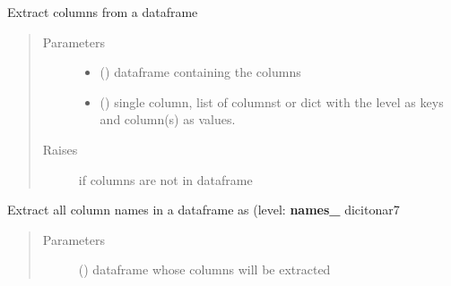 \documentclass[letterpaper,10pt,english]{sphinxmanual}
\begin{document}
\begin{fulllineitems}
\label{\detokenize{dalio.util:dalio.util.level_utils.extract_cols}}
Extract columns from a dataframe
\begin{quote}\begin{description}
\item[{Parameters}] \leavevmode\begin{itemize}
\item {} 
 () \textendash{} dataframe containing the columns

\item {} 
 (\sphinxstyleliteralemphasis{\sphinxupquote{, }}\sphinxstyleliteralemphasis{\sphinxupquote{, }}) \textendash{} single column, list of columnst
or dict with the level as keys and column(s) as values.

\end{itemize}

\item[{Raises}] \leavevmode
{} \textendash{} if columns are not in dataframe

\end{description}\end{quote}

\end{fulllineitems}


\begin{fulllineitems}
\label{\detokenize{dalio.util:dalio.util.level_utils.extract_level_names_dict}}
Extract all column names in a dataframe as (level: {\color{red}\bfseries{}names\_} dicitonar7
\begin{quote}\begin{description}
\item[{Parameters}] \leavevmode
{} () \textendash{} dataframe whose columns will be extracted

\end{description}\end{quote}

\end{fulllineitems}
\end{document}
